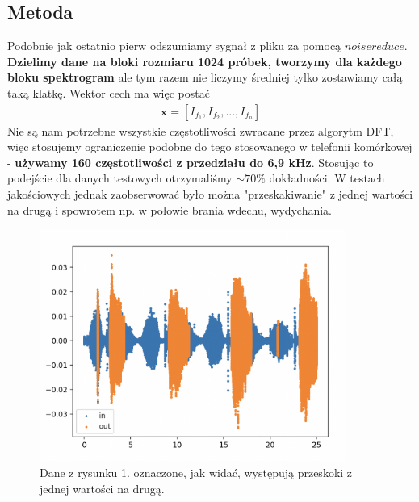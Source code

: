 \documentclass[polish]{article}
\begin{document}
\subsection{Metoda}
Podobnie jak ostatnio pierw odszumiamy sygnał z pliku za pomocą $noisereduce$. \textbf{Dzielimy dane na bloki
rozmiaru 1024 próbek, tworzymy dla każdego bloku spektrogram} ale tym razem nie liczymy średniej tylko zostawiamy całą taką klatkę. Wektor cech ma więc postać 
\begin{gather*}
\boldsymbol{x} = [I_{f_1}, I_{f_2}, ..., I_{f_n}]
\end{gather*}
Nie są nam 
potrzebne wszystkie częstotliwości zwracane przez algorytm DFT, więc stosujemy ograniczenie podobne
do tego stosowanego w telefonii komórkowej -  \textbf{używamy 160 częstotliwości z przedziału do 6,9 kHz}.
Stosując to podejście dla danych testowych otrzymaliśmy $\sim 70\%$ dokładności. W testach
jakościowych jednak zaobserwować było można "przeskakiwanie" z jednej
wartości na drugą i spowrotem np. w połowie brania wdechu, wydychania.
\begin{figure}[H]
	\centering
	\includegraphics[width=10cm]{przeskakiwanie}
  	\caption{Dane z rysunku 1. oznaczone, jak widać, występują przeskoki z jednej wartości na drugą.}
\end{figure}
\end{document}
